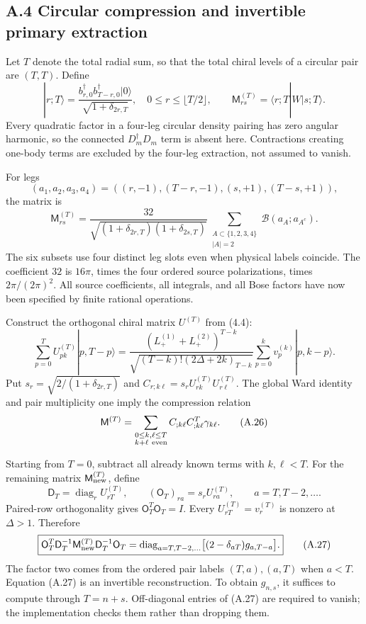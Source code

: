 \hypertarget{a.4-circular-compression-and-invertible-primary-extraction}{%
\subsection{A.4 Circular compression and invertible primary extraction}\label{a.4-circular-compression-and-invertible-primary-extraction}}

Let \(T\) denote the total radial sum, so that the total chiral levels of a circular pair are \((T,T)\). Define \[
|r;T\rangle=
\frac{b^\dagger_{r,0}b^\dagger_{T-r,0}|0\rangle}
{\sqrt{1+\delta_{2r,T}}},
\quad 0\le r\le\lfloor T/2\rfloor,
\qquad
\mathsf M^{(T)}_{rs}=\langle r;T|W|s;T\rangle.
\] Every quadratic factor in a four-leg circular density pairing has zero angular harmonic, so the connected \(D_m^\dagger D_m\) term is absent here. Contractions creating one-body terms are excluded by the four-leg extraction, not assumed to vanish.

For legs \[
(a_1,a_2,a_3,a_4)
=((r,-1),(T-r,-1),(s,+1),(T-s,+1)),
\] the matrix is \[
\boxed{
\mathsf M^{(T)}_{rs}
=\frac{32}{\sqrt{(1+\delta_{2r,T})(1+\delta_{2s,T})}}
\sum_{\substack{A\subset\{1,2,3,4\}\\|A|=2}}
\mathcal B(a_A;a_{A^c}).
}
\tag{A.24}
\] The six subsets use four distinct leg slots even when physical labels coincide. The coefficient \(32\) is \(16\pi\), times the four ordered source polarizations, times \(2\pi/(2\pi)^2\). All source coefficients, all integrals, and all Bose factors have now been specified by finite rational operations.

Construct the orthogonal chiral matrix \(U^{(T)}\) from (4.4): \[
\sum_{p=0}^T U^{(T)}_{pk}|p,T-p\rangle
=\frac{(L_+^{(1)}+L_+^{(2)})^{T-k}}
{\sqrt{(T-k)!(2\Delta+2k)_{T-k}}}
\sum_{p=0}^k v_p^{(k)}|p,k-p\rangle.
\tag{A.25}
\] Put \(s_r=\sqrt{2/(1+\delta_{2r,T})}\) and \(C_{r;k\ell}=s_rU^{(T)}_{rk}U^{(T)}_{r\ell}\). The global Ward identity and pair multiplicity one imply the compression relation \[
\mathsf M^{(T)}
=\sum_{\substack{0\le k,\ell\le T\\k+\ell\ {\rm even}}}
C_{;k\ell}C_{;k\ell}^{T}\gamma_{k\ell}.
\tag{A.26}
\]

Starting from \(T=0\), subtract all already known terms with \(k,\ell<T\). For the remaining matrix \(\mathsf M_{\rm new}^{(T)}\), define \[
\mathsf D_T=\operatorname{diag}_r U^{(T)}_{rT},
\qquad
(\mathsf O_T)_{ra}=s_rU^{(T)}_{ra},
\qquad a=T,T-2,\ldots .
\] Paired-row orthogonality gives \(\mathsf O_T^T\mathsf O_T=I\). Every \(U^{(T)}_{rT}=v_r^{(T)}\) is nonzero at \(\Delta>1\). Therefore \[
\boxed{
\mathsf O_T^T\mathsf D_T^{-1}\mathsf M_{\rm new}^{(T)}
\mathsf D_T^{-1}\mathsf O_T
=\operatorname{diag}_{a=T,T-2,\ldots}
\bigl[(2-\delta_{aT})g_{a,T-a}\bigr].
}
\tag{A.27}
\] The factor two comes from the ordered pair labels \((T,a),(a,T)\) when \(a<T\). Equation (A.27) is an invertible reconstruction. To obtain \(g_{n,s}\), it suffices to compute through \(T=n+s\). Off-diagonal entries of (A.27) are required to vanish; the implementation checks them rather than dropping them.

